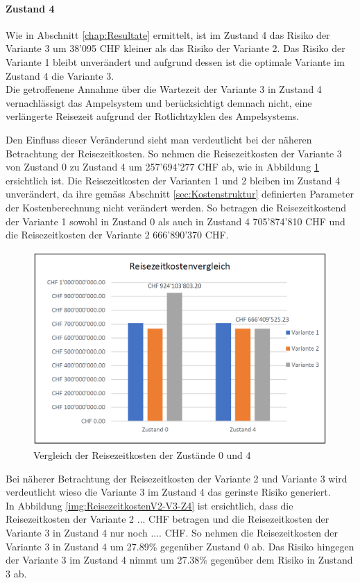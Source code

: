 \paragraph{Zustand 4} 

Wie in Abschnitt \ref{chap:Resultate} ermittelt, ist im Zustand 4 das Risiko der Variante 3 um 38'095 CHF kleiner als das Risiko der Variante 2. Das Risiko der Variante 1 bleibt unverändert und aufgrund dessen ist die optimale Variante im Zustand 4 die Variante 3. \\
Die getroffenene Annahme über die Wartezeit der Variante 3 in Zustand 4 vernachlässigt das Ampelsystem und berücksichtigt demnach nicht, eine verlängerte Reisezeit aufgrund der Rotlichtzyklen des Ampelsystems. 

Den Einfluss dieser Veränderund sieht man verdeutlicht bei der näheren Betrachtung der Reisezeitkosten. So nehmen die Reisezeitkosten der Variante 3 von Zustand 0 zu Zustand 4 um  257'694'277 CHF ab, wie in Abbildung \ref{img:ReisezeitkostenZ0-Z4} ersichtlich ist. Die Reisezeitkosten der Varianten 1 und 2 bleiben im Zustand 4 unverändert, da ihre gemäss Abschnitt \ref{sec:Kostenstruktur} definierten Parameter der Kostenberechnung nicht verändert werden. So betragen die Reisezeitkostend der Variante 1 sowohl in Zustand 0 als auch in Zustand 4 705'874'810 CHF und die Reisezeitkosten der Variante 2 666'890'370 CHF.


\begin{figure}[h!]
	\centering
	\includegraphics[width=.45\textwidth]{figures/f-06-06-ReisezeitVergleichZ0-Z4}
	\caption[Reisezeitkostenvergleich Zustand 0 und 4]{Vergleich der Reisezeitkosten der Zustände 0 und 4}
	\label{img:ReisezeitkostenZ0-Z4}
\end{figure} 

Bei näherer Betrachtung der Reisezeitkosten der Variante 2 und Variante 3 wird verdeutlicht wieso die Variante 3 im Zustand 4 das gerinste Risiko generiert. \\
In Abbildung \ref{img:ReisezeitkostenV2-V3-Z4} ist ersichtlich, dass die Reisezeitkosten der Variante 2 ... CHF betragen und die Reisezeitkosten der Variante 3 in Zustand 4 nur noch .... CHF. So nehmen die Reisezeitkosten der Variante 3 in Zustand 4 um 27.89\% gegenüber Zustand 0 ab. Das Risiko hingegen der Variante 3 im Zustand 4 nimmt um 27.38\% gegenüber dem Risiko in Zustand 3 ab.

